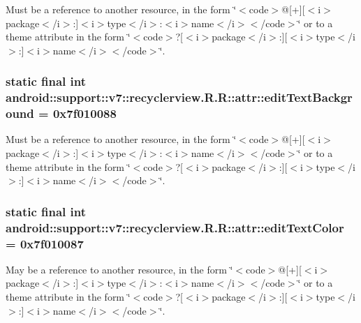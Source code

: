 Must be a reference to another resource, in the form \char`\"{}$<$code$>$@\mbox{[}+\mbox{]}\mbox{[}$<$i$>$package$<$/i$>$:\mbox{]}$<$i$>$type$<$/i$>$:$<$i$>$name$<$/i$>$$<$/code$>$\char`\"{} or to a theme attribute in the form \char`\"{}$<$code$>$?\mbox{[}$<$i$>$package$<$/i$>$:\mbox{]}\mbox{[}$<$i$>$type$<$/i$>$:\mbox{]}$<$i$>$name$<$/i$>$$<$/code$>$\char`\"{}. \hypertarget{classandroid_1_1support_1_1v7_1_1recyclerview_1_1_r_1_1attr_42d9326183b645a45ffb095305f86c23}{
\subsubsection[{editTextBackground}]{\setlength{\rightskip}{0pt plus 5cm}static final int android::support::v7::recyclerview.R.R::attr::editTextBackground = 0x7f010088}}
\label{classandroid_1_1support_1_1v7_1_1recyclerview_1_1_r_1_1attr_42d9326183b645a45ffb095305f86c23}


Must be a reference to another resource, in the form \char`\"{}$<$code$>$@\mbox{[}+\mbox{]}\mbox{[}$<$i$>$package$<$/i$>$:\mbox{]}$<$i$>$type$<$/i$>$:$<$i$>$name$<$/i$>$$<$/code$>$\char`\"{} or to a theme attribute in the form \char`\"{}$<$code$>$?\mbox{[}$<$i$>$package$<$/i$>$:\mbox{]}\mbox{[}$<$i$>$type$<$/i$>$:\mbox{]}$<$i$>$name$<$/i$>$$<$/code$>$\char`\"{}. \hypertarget{classandroid_1_1support_1_1v7_1_1recyclerview_1_1_r_1_1attr_9a251d7cfd049782b491a3a19467e742}{
\subsubsection[{editTextColor}]{\setlength{\rightskip}{0pt plus 5cm}static final int android::support::v7::recyclerview.R.R::attr::editTextColor = 0x7f010087}}
\label{classandroid_1_1support_1_1v7_1_1recyclerview_1_1_r_1_1attr_9a251d7cfd049782b491a3a19467e742}


May be a reference to another resource, in the form \char`\"{}$<$code$>$@\mbox{[}+\mbox{]}\mbox{[}$<$i$>$package$<$/i$>$:\mbox{]}$<$i$>$type$<$/i$>$:$<$i$>$name$<$/i$>$$<$/code$>$\char`\"{} or to a theme attribute in the form \char`\"{}$<$code$>$?\mbox{[}$<$i$>$package$<$/i$>$:\mbox{]}\mbox{[}$<$i$>$type$<$/i$>$:\mbox{]}$<$i$>$name$<$/i$>$$<$/code$>$\char`\"{}. 

